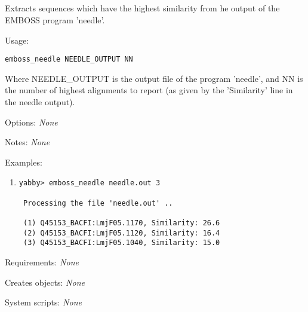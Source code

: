 

\subsection[emboss\_needle]{  }



Extracts sequences which have the highest similarity from
he output of the EMBOSS program 'needle'.


\begin{description}


\item{Usage:}

{\tt emboss\_needle NEEDLE\_OUTPUT NN}

  Where NEEDLE\_OUTPUT is the output file of the program 'needle',
  and NN is the number of highest alignments to report (as given
  by the 'Similarity' line in the needle output).


\item{Options:} {\em None}


\item{Notes:} {\em None}


\item{Examples:}
\begin{enumerate}

\item
\begin{verbatim}
yabby> emboss_needle needle.out 3

 Processing the file 'needle.out' ..

 (1) Q45153_BACFI:LmjF05.1170, Similarity: 26.6
 (2) Q45153_BACFI:LmjF05.1120, Similarity: 16.4
 (3) Q45153_BACFI:LmjF05.1040, Similarity: 15.0

\end{verbatim}

\end{enumerate}


\item{Requirements:} {\em None}


\item{Creates objects:} {\em None}


\item{System scripts:} {\em None}

\end{description}

